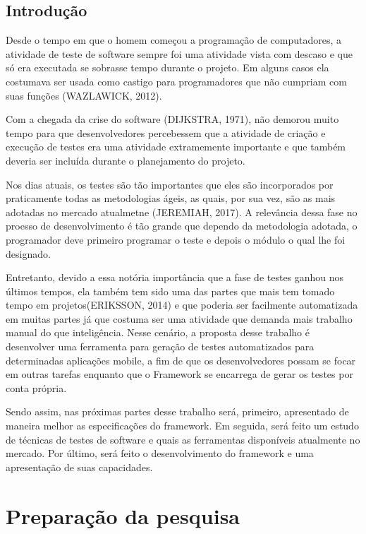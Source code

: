 \documentclass[
  12pt,       %
  openright,      %
  twoside,      %
  a4paper,      %
  english,      %
  french,       %
  spanish,      %
  brazil,       %
  ]{abntex2}
\begin{document}
\chapter*[Introdução]{Introdução}

Desde o tempo em que o homem começou a programação de computadores, a atividade
de teste de software sempre foi uma atividade vista com descaso e que só era
executada se sobrasse tempo durante o projeto. Em alguns casos ela costumava ser
usada como castigo para programadores que não cumpriam com suas funções
(WAZLAWICK, 2012).

Com a chegada da crise do software (DIJKSTRA, 1971), não demorou muito tempo
para que desenvolvedores percebessem que a atividade de criação e execução de
testes era uma atividade extramemente importante e que também deveria ser
incluída durante o planejamento do projeto.

Nos dias atuais, os testes são tão importantes que eles são incorporados
por praticamente todas as metodologias ágeis, as quais, por sua vez,
são as mais adotadas no mercado atualmetne (JEREMIAH, 2017). A relevância dessa fase
no proesso de desenvolvimento é tão grande que dependo da metodologia
adotada, o programador deve primeiro programar o teste e depois o módulo
o qual lhe foi designado.

Entretanto, devido a essa notória importância que a fase de testes ganhou nos
últimos tempos, ela também tem sido uma das partes que mais tem tomado tempo
em projetos(ERIKSSON, 2014) e que poderia ser facilmente automatizada em muitas partes já que
costuma ser uma atividade que demanda mais trabalho manual do que inteligência.
Nesse cenário, a proposta desse trabalho é desenvolver uma ferramenta para
geração de testes automatizados para determinadas aplicações mobile, a fim de
que os desenvolvedores possam se focar em outras tarefas enquanto
que o Framework se encarrega de gerar os testes por conta própria.

Sendo assim, nas próximas partes desse trabalho será, primeiro, apresentado de maneira melhor
as especificações do framework. Em seguida, será feito um estudo de técnicas de testes
de software e quais as ferramentas disponíveis atualmente no mercado. Por último, será feito
o desenvolvimento do framework e uma apresentação de suas capacidades.

\part{Preparação da pesquisa}
\end{document}
